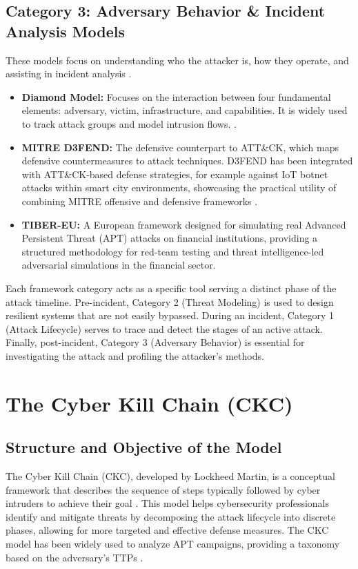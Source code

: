 \subsection{Category 3: Adversary Behavior \& Incident Analysis Models}
These models focus on understanding who the attacker is, how they operate, and assisting in incident analysis \cite{tatam2021review, huang2024security}.
\begin{itemize}
    \item \textbf{Diamond Model:} Focuses on the interaction between four fundamental elements: adversary, victim, infrastructure, and capabilities. It is widely used to track attack groups and model intrusion flows. \cite{tatam2021review, huang2024security}.
    \item \textbf{MITRE D3FEND:} The defensive counterpart to ATT\&CK, which maps defensive countermeasures to attack techniques. D3FEND has been integrated with ATT\&CK-based defense strategies, for example against IoT botnet attacks within smart city environments, showcasing the practical utility of combining MITRE offensive and defensive frameworks \cite{jiang2025mitre}.
    \item \textbf{TIBER-EU:} A European framework designed for simulating real Advanced Persistent Threat (APT) attacks on financial institutions, providing a structured methodology for red-team testing and threat intelligence-led adversarial simulations in the financial sector.
\end{itemize}

Each framework category acts as a specific tool serving a distinct phase of the attack timeline. Pre-incident, Category 2 (Threat Modeling) is used to design resilient systems that are not easily bypassed. During an incident, Category 1 (Attack Lifecycle) serves to trace and detect the stages of an active attack. Finally, post-incident, Category 3 (Adversary Behavior) is essential for investigating the attack and profiling the attacker's methods.

\section{The Cyber Kill Chain (CKC)}
\subsection{Structure and Objective of the Model}
The Cyber Kill Chain (CKC), developed by Lockheed Martin, is a conceptual framework that describes the sequence of steps typically followed by cyber intruders to achieve their goal \cite{singh2016comprehensive, ahmed2021cyber}. This model helps cybersecurity professionals identify and mitigate threats by decomposing the attack lifecycle into discrete phases, allowing for more targeted and effective defense measures. The CKC model has been widely used to analyze APT campaigns, providing a taxonomy based on the adversary's TTPs \cite{jiang2025mitre, ahmed2021cyber}.

